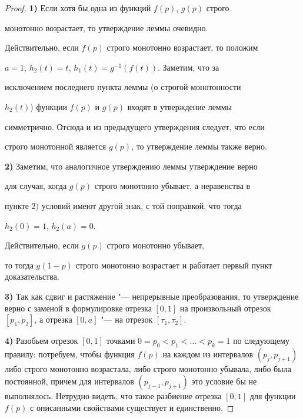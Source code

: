 \smallskip



\begin{proof} 



{\bf 1)} Если хотя бы одна из функций $f(p)$, $g(p)$ строго

монотонно возрастает, то утверждение леммы очевидно.



Действительно, если $f(p)$ строго монотонно возрастает, то положим

$a=1$, $h_2(t)=t$, $h_1(t)=g^{-1}(f(t))$. Заметим, что за

исключением последнего пункта леммы (о строгой монотонности

$h_2(t)$) функции $f(p)$ и $g(p)$ входят в утверждение леммы

симметрично. Отсюда и из предыдущего утверждения следует, что если

строго монотонной является $g(p)$, то утверждение леммы также верно.



\smallskip



{\bf 2)} Заметим, что аналогичное утверждению леммы утверждение верно

для случая, когда $g(p)$ строго монотонно убывает, а неравенства в

пункте $2)$ условий имеют другой знак, с той поправкой, что тогда

$h_2(0)=1$, $h_2(a)=0$. 



Действительно, если $g(p)$ строго монотонно убывает,

то тогда $g(1-p)$ строго монотонно возрастает и работает первый пункт доказательства.



\smallskip



{\bf 3)} Так как сдвиг и растяжение "--- непрерывные преобразования, то утверждение верно с заменой в формулировке отрезка $[0,1]$ на произвольный отрезок $[p_1,p_2]$, а отрезка $[0,a]$ "--- на отрезок $[\tau_1,\tau_2]$.



\smallskip



{\bf 4)} Разобьем отрезок $[0,1]$ точками $0=p_0<p_1<\dots<p_k=1$ по следующему правилу: потребуем, чтобы функция $f(p)$ на каждом из интервалов $(p_j,p_{j+1})$ либо строго монотонно возрастала, либо строго монотонно убывала, либо была постоянной, причем для интервалов $(p_{j-1},p_{j+1})$ это условие бы не выполнялось. Нетрудно видеть, что такое разбиение отрезка $[0,1]$ для функции $f(p)$ с описанными свойствами существует и единственно.




\end{proof}

